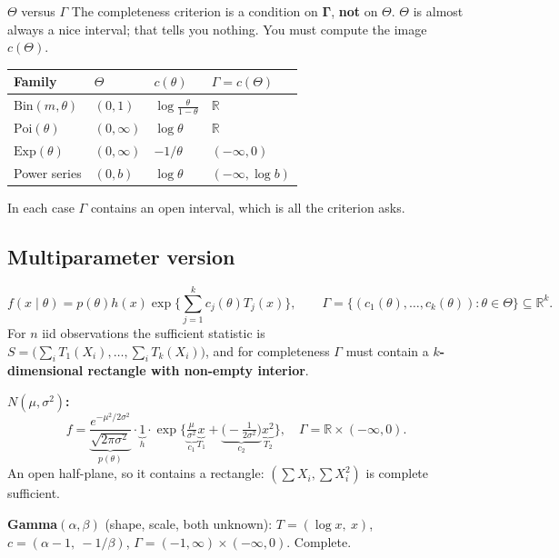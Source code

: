 \documentclass[11pt]{article}
\newcommand{\R}{\mathbb{R}}
\begin{document}
\begin{confusion}{$\Theta$ versus $\Gamma$}
The completeness criterion is a condition on $\boldsymbol\Gamma$, \textbf{not} on $\Theta$.
$\Theta$ is almost always a nice interval; that tells you nothing. You must compute the image
$c(\Theta)$.
\begin{center}
\renewcommand{\arraystretch}{1.3}
\begin{tabular}{@{}llll@{}}
\toprule
Family & $\Theta$ & $c(\theta)$ & $\Gamma=c(\Theta)$ \\
\midrule
$\mathrm{Bin}(m,\theta)$ & $(0,1)$ & $\log\frac{\theta}{1-\theta}$ & $\R$ \\
$\mathrm{Poi}(\theta)$ & $(0,\infty)$ & $\log\theta$ & $\R$ \\
$\mathrm{Exp}(\theta)$ & $(0,\infty)$ & $-1/\theta$ & $(-\infty,0)$ \\
Power series & $(0,b)$ & $\log\theta$ & $(-\infty,\log b)$ \\
\bottomrule
\end{tabular}
\end{center}
In each case $\Gamma$ contains an open interval, which is all the criterion asks.
\end{confusion}

\subsection{Multiparameter version}

\[
f(x\mid\theta)=p(\theta)h(x)\exp\Big\{\sum_{j=1}^{k}c_j(\theta)T_j(x)\Big\},
\qquad
\Gamma=\big\{(c_1(\theta),\dots,c_k(\theta)):\theta\in\Theta\big\}\subseteq\R^{k}.
\]
For $n$ iid observations the sufficient statistic is
$S=\big(\sum_iT_1(X_i),\dots,\sum_iT_k(X_i)\big)$, and for completeness $\Gamma$ must contain a
\textbf{$k$-dimensional rectangle with non-empty interior}.

\smallskip
\textbf{$N(\mu,\sigma^{2})$:}
\[
f=\underbrace{\frac{e^{-\mu^{2}/2\sigma^{2}}}{\sqrt{2\pi\sigma^{2}}}}_{p(\theta)}\cdot
\underbrace{1}_{h}\cdot
\exp\Big\{\underbrace{\tfrac{\mu}{\sigma^{2}}}_{c_1}\underbrace{x}_{T_1}
+\underbrace{\big(-\tfrac{1}{2\sigma^{2}}\big)}_{c_2}\underbrace{x^{2}}_{T_2}\Big\},
\quad \Gamma=\R\times(-\infty,0).
\]
An open half-plane, so it contains a rectangle: $(\sum X_i,\sum X_i^{2})$ is complete
sufficient.

\smallskip
\textbf{Gamma$(\alpha,\beta)$} (shape, scale, both unknown): $T=(\log x,\ x)$,
$c=(\alpha-1,\ -1/\beta)$, $\Gamma=(-1,\infty)\times(-\infty,0)$. Complete.
\end{document}

